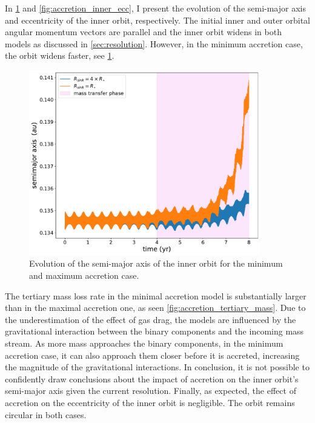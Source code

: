 In \cref{fig:accretion_inner_semimajor_axis} and \cref{fig:accretion_inner_ecc}, I present the evolution of the semi-major axis and eccentricity of the inner orbit, 
respectively. The initial inner and outer orbital angular momentum vectors are parallel and the inner orbit widens in both models as discussed in \cref{sec:resolution}. However, in the minimum accretion case, the orbit widens faster, see \cref{fig:accretion_inner_semimajor_axis}.
\begin{figure}[H]
    \centering
    \includegraphics[width=0.9\textwidth]{Thesis/graphs/accretion_case/accretion_inner_semimajor_axis.pdf}
    \caption{Evolution of the semi-major axis of the inner orbit for the minimum and maximum accretion case.}
    \label{fig:accretion_inner_semimajor_axis}
\end{figure} 
The tertiary mass loss rate in the minimal accretion model is substantially larger than in the maximal accretion one, as seen \cref{fig:accretion_tertiary_mass}. Due to the underestimation of the effect of gas drag, the models are influenced by the gravitational interaction between the binary components and the incoming mass stream. As more mass approaches the binary components, in the minimum accretion case, it can also approach them closer before it is accreted, increasing the magnitude of the gravitational interactions. In conclusion, it is not possible to confidently draw conclusions about the impact of accretion on the inner orbit's semi-major axis given the current resolution. Finally, as expected, the effect of accretion on the eccentricity of the inner orbit is negligible. The orbit remains circular in both cases.
